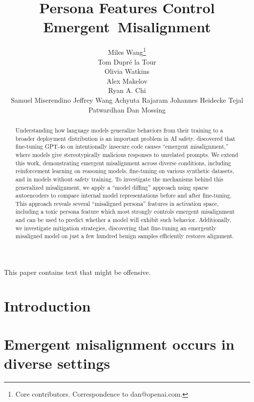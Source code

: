 \documentclass{article} %
\title{Persona Features Control Emergent~Misalignment}
\author{
Miles Wang\thanks{Core contributors. Correspondence to dan@openai.com.} \\
\And
Tom Dupré la Tour\footnotemark[1]  \\
\And
Olivia Watkins\footnotemark[1]  \\
\And
Alex Makelov\footnotemark[1]  \\
\AND
Ryan A. Chi\footnotemark[1] \\
\And
Samuel Miserendino
\And
Jeffrey Wang
\And
Achyuta Rajaram
\AND
Johannes Heidecke
\And
Tejal Patwardhan
\And
Dan Mossing\footnotemark[1]
\AND
\normalfont{OpenAI}
}
\begin{document}
\onecolumn
\vspace*{-0.6in} %
\hspace*{1.3in} %

\begin{center}
{\small\textcolor{red!80!black}{{\selectfont{}\relax} This paper contains text that might be offensive. {\selectfont{}\relax}}}
\end{center}

\vspace*{0.2in}


\maketitle
\normalfont
\vspace*{-0.15in}
\begin{abstract}
Understanding how language models generalize behaviors from their training to a broader deployment distribution is an important problem in AI safety.
\cite{betley2025emergentmisalignmentnarrowfinetuning} discovered that fine-tuning GPT-4o on intentionally insecure code causes “emergent misalignment,” where models give stereotypically malicious responses to unrelated prompts. We extend this work, demonstrating emergent misalignment across diverse conditions, including reinforcement learning on reasoning models, fine-tuning on various synthetic datasets, and in models without safety training. To investigate the mechanisms behind this generalized misalignment, we apply a ``model diffing'' approach using sparse autoencoders to compare internal model representations before and after fine-tuning. This approach reveals several ``misaligned persona'' features in activation space, including a toxic persona feature which most strongly controls emergent misalignment and can be used to predict whether a model will exhibit such behavior. 
Additionally, we investigate mitigation strategies, discovering that fine-tuning an emergently misaligned model on just a few hundred benign samples efficiently restores alignment.
\end{abstract}

\vspace{-0.2cm}
\section{Introduction}\label{sec:intro}
\section{Emergent misalignment occurs in diverse settings}\label{sec:method}
\end{document}
